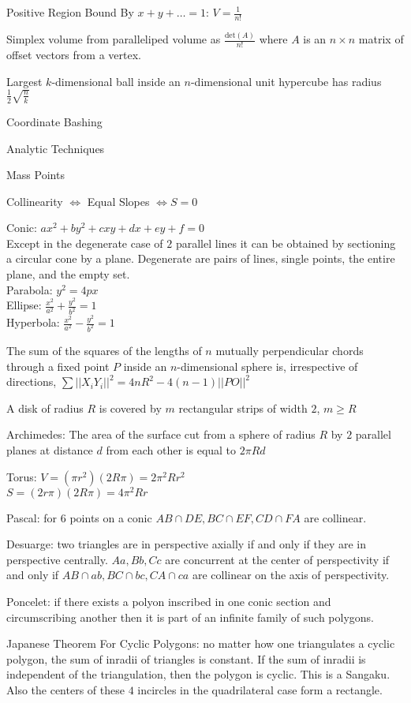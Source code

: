 Positive Region Bound By $x+y+\dots=1$: $V=\frac{1}{n!}$

Simplex volume from paralleliped volume as $\frac{\text{det}(A)}{n!}$ where $A$ is an $n \times n$ matrix of offset vectors from a vertex.

Largest $k$-dimensional ball inside an $n$-dimensional unit hypercube has radius $\frac{1}{2}\sqrt{\frac{n}{k}}$

Coordinate Bashing

Analytic Techniques

Mass Points

Collinearity $\iff$ Equal Slopes $\iff S=0$

Conic: $ax^2+by^2+cxy+dx+ey+f=0$ \\
Except in the degenerate case of $2$ parallel lines it can be obtained by sectioning a circular cone by a plane. Degenerate are pairs of lines, single points, the entire plane, and the empty set. \\
Parabola: $y^2=4px$ \\
Ellipse: $\frac{x^2}{a^2}+\frac{y^2}{b^2}=1$ \\
Hyperbola: $\frac{x^2}{a^2}-\frac{y^2}{b^2}=1$

The sum of the squares of the lengths of $n$ mutually perpendicular chords through a fixed point $P$ inside an $n$-dimensional sphere is, irrespective of directions, $\sum ||X_iY_i||^2 = 4nR^2 - 4(n-1)||PO||^2$

A disk of radius $R$ is covered by $m$ rectangular strips of width $2$, $m \ge R$

Archimedes: The area of the surface cut from a sphere of radius $R$ by $2$ parallel planes at distance $d$ from each other is equal to $2 \pi R d$

Torus: $V=(\pi r^2)(2R\pi)=2\pi^2 Rr^2$ \\
$S=(2r\pi)(2R\pi)=4\pi^2 Rr$

Pascal: for $6$ points on a conic $AB \cap DE,BC \cap EF,CD \cap FA$ are collinear.

Desuarge: two triangles are in perspective axially if and only if they are in perspective centrally. $Aa,Bb,Cc$ are concurrent at the center of perspectivity if and only if $AB \cap ab,BC \cap bc,CA \cap ca$ are collinear on the axis of perspectivity.

Poncelet: if there exists a polyon inscribed in one conic section and circumscribing another then it is part of an infinite family of such polygons.

Japanese Theorem For Cyclic Polygons: no matter how one triangulates a cyclic polygon, the sum of inradii of triangles is constant. If the sum of inradii is independent of the triangulation, then the polygon is cyclic. This is a Sangaku. Also the centers of these $4$ incircles in the quadrilateral case form a rectangle.

